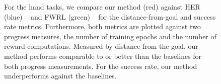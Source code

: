 \begin{figure}
{\begin{minipage}{0.55\linewidth}
%
\end{minipage}%
}
  \caption{For the hand tasks, we compare our method (red) against HER (blue) ~\citep{andrychowicz2016learning}
    and FWRL (green) ~\citep{kaelbling1993learning} for the distance-from-goal
    and success rate metrics. Furthermore, both metrics are plotted
    against two progress measures, the number of training epochs and the number of reward
    computations. Measured by distance from the goal, our method performs comparable to or
    better than the baselines for both progress measurements. For the success rate,
    our method underperforms against the baselines. 
}%
  \label{fig:hand-results}%
\end{figure}%

